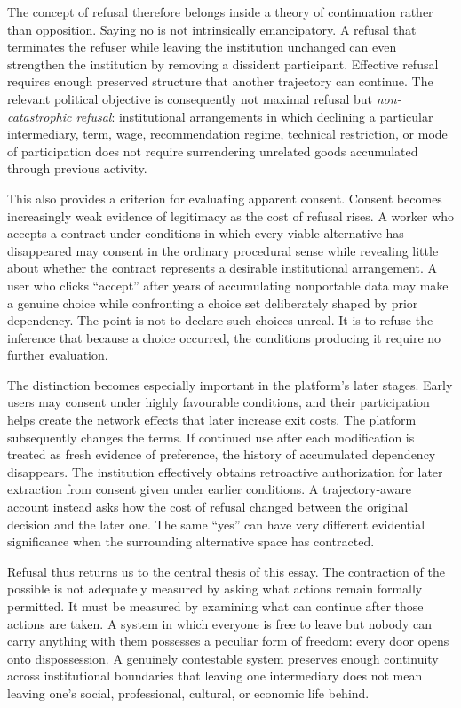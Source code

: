 \documentclass[11pt]{article}
\begin{document}
The concept of refusal therefore belongs inside a theory of continuation rather than opposition. Saying no is not intrinsically emancipatory. A refusal that terminates the refuser while leaving the institution unchanged can even strengthen the institution by removing a dissident participant. Effective refusal requires enough preserved structure that another trajectory can continue. The relevant political objective is consequently not maximal refusal but \emph{non-catastrophic refusal}: institutional arrangements in which declining a particular intermediary, term, wage, recommendation regime, technical restriction, or mode of participation does not require surrendering unrelated goods accumulated through previous activity.

This also provides a criterion for evaluating apparent consent. Consent becomes increasingly weak evidence of legitimacy as the cost of refusal rises. A worker who accepts a contract under conditions in which every viable alternative has disappeared may consent in the ordinary procedural sense while revealing little about whether the contract represents a desirable institutional arrangement. A user who clicks ``accept'' after years of accumulating nonportable data may make a genuine choice while confronting a choice set deliberately shaped by prior dependency. The point is not to declare such choices unreal. It is to refuse the inference that because a choice occurred, the conditions producing it require no further evaluation.

The distinction becomes especially important in the platform's later stages. Early users may consent under highly favourable conditions, and their participation helps create the network effects that later increase exit costs. The platform subsequently changes the terms. If continued use after each modification is treated as fresh evidence of preference, the history of accumulated dependency disappears. The institution effectively obtains retroactive authorization for later extraction from consent given under earlier conditions. A trajectory-aware account instead asks how the cost of refusal changed between the original decision and the later one. The same ``yes'' can have very different evidential significance when the surrounding alternative space has contracted.

Refusal thus returns us to the central thesis of this essay. The contraction of the possible is not adequately measured by asking what actions remain formally permitted. It must be measured by examining what can continue after those actions are taken. A system in which everyone is free to leave but nobody can carry anything with them possesses a peculiar form of freedom: every door opens onto dispossession. A genuinely contestable system preserves enough continuity across institutional boundaries that leaving one intermediary does not mean leaving one's social, professional, cultural, or economic life behind.
\end{document}
